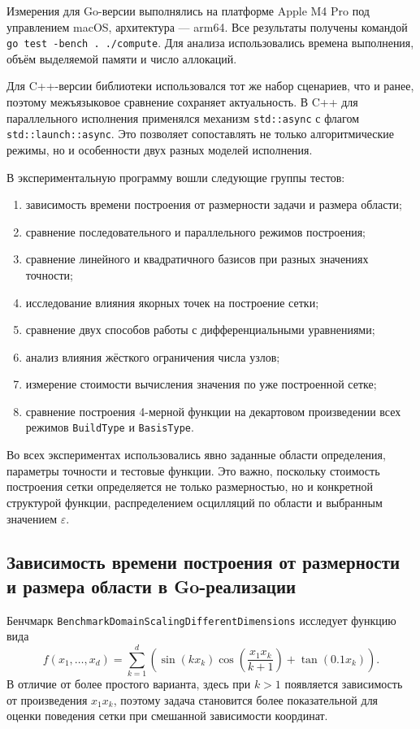 Измерения для Go-версии выполнялись на платформе Apple M4 Pro под управлением macOS, архитектура --- arm64. Все результаты получены командой \texttt{go test -bench . ./compute}. Для анализа использовались времена выполнения, объём выделяемой памяти и число аллокаций.

Для C++-версии библиотеки использовался тот же набор сценариев, что и ранее, поэтому межъязыковое сравнение сохраняет актуальность. В C++ для параллельного исполнения применялся механизм \texttt{std::async} с флагом \texttt{std::launch::async}. Это позволяет сопоставлять не только алгоритмические режимы, но и особенности двух разных моделей исполнения.

В экспериментальную программу вошли следующие группы тестов:
\begin{enumerate}
    \item зависимость времени построения от размерности задачи и размера области;
    \item сравнение последовательного и параллельного режимов построения;
    \item сравнение линейного и квадратичного базисов при разных значениях точности;
    \item исследование влияния якорных точек на построение сетки;
    \item сравнение двух способов работы с дифференциальными уравнениями;
    \item анализ влияния жёсткого ограничения числа узлов;
    \item измерение стоимости вычисления значения по уже построенной сетке;
    \item сравнение построения 4-мерной функции на декартовом произведении всех режимов \texttt{BuildType} и \texttt{BasisType}.
\end{enumerate}

Во всех экспериментах использовались явно заданные области определения, параметры точности и тестовые функции. Это важно, поскольку стоимость построения сетки определяется не только размерностью, но и конкретной структурой функции, распределением осцилляций по области и выбранным значением $\varepsilon$.

\subsection{Зависимость времени построения от размерности и размера области в Go-реализации}

Бенчмарк \texttt{BenchmarkDomainScalingDifferentDimensions} исследует функцию вида
\begin{equation}
    f(x_1, \dots, x_d) = \sum_{k=1}^{d} \left(\sin(k x_k)\cos\left(\frac{x_1x_k}{k+1}\right) + \tan(0.1x_k)\right).
\end{equation}
В отличие от более простого варианта, здесь при $k>1$ появляется зависимость от произведения $x_1x_k$, поэтому задача становится более показательной для оценки поведения сетки при смешанной зависимости координат.

